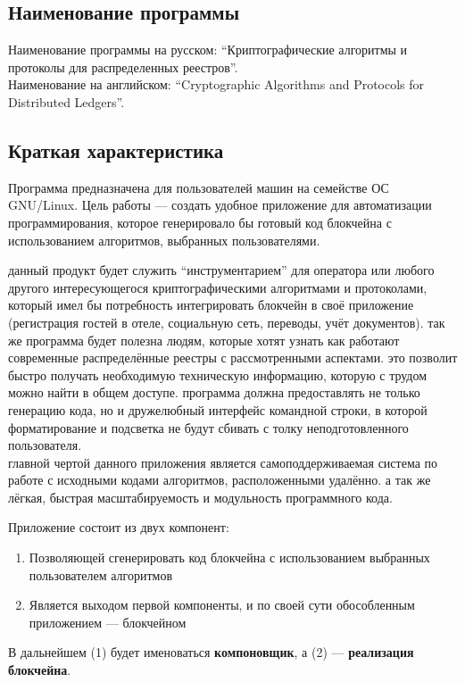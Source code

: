 \subsection{Наименование программы}
Наименование программы на русском:
``Криптографические алгоритмы и протоколы для распределенных реестров''. \\
Наименование на английском:
``Cryptographic Algorithms and Protocols for Distributed Ledgers''. \\


\subsection{Краткая характеристика}
Программа предназначена для пользователей машин на семействе ОС GNU/Linux.
Цель работы --- создать удобное приложение для автоматизации программирования,
которое генерировало бы готовый код блокчейна с использованием алгоритмов,
выбранных пользователями.

данный продукт будет служить ``инструментарием'' для оператора или любого
другого интересующегося криптографическими алгоритмами и протоколами, который
имел бы потребность интегрировать блокчейн в своё приложение (регистрация
гостей в отеле, социальную сеть, переводы, учёт документов). так же программа
будет полезна людям, которые хотят узнать как работают современные
распределённые реестры с рассмотренными
аспектами. это позволит быстро получать необходимую техническую информацию,
которую с трудом можно найти в общем доступе. программа должна предоставлять не
только генерацию кода, но и дружелюбный интерфейс командной строки, в которой
форматирование и подсветка не будут сбивать с толку неподготовленного
пользователя.\\

главной чертой данного приложения является самоподдерживаемая система по работе
с исходными кодами алгоритмов, расположенными удалённо. а так же лёгкая,
быстрая масштабируемость и модульность программного кода.

Приложение состоит из двух компонент:
\begin{enumerate}
    \item Позволяющей сгенерировать код блокчейна с использованием выбранных
          пользователем алгоритмов
    \item Является выходом первой компоненты, и по своей сути обособленным приложением --- блокчейном
\end{enumerate}

В дальнейшем (1) будет именоваться \textbf{компоновщик}, а (2) --- \textbf{реализация блокчейна}. 
